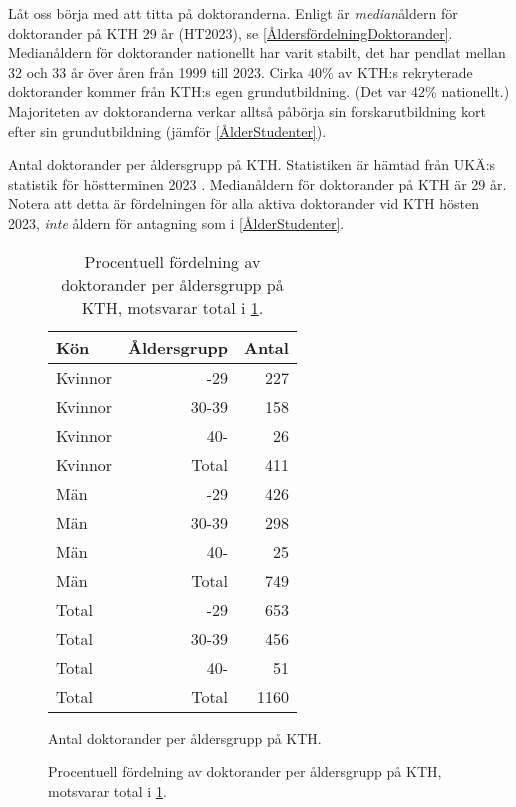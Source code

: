 \documentclass[a4paper,oneside,article,swedish]{memoir}
\begin{document}
Låt oss börja med att titta på doktoranderna.
Enligt \textcite{UKÄstat} är \emph{median}åldern för doktorander på KTH 29 år 
(HT2023), se \cref{ÅldersfördelningDoktorander}.
Medianåldern för doktorander nationellt har varit stabilt, det har pendlat 
mellan 32 och 33 år över åren från 1999 till 2023.
Cirka 40\% av KTH:s rekryterade doktorander kommer från KTH:s egen  
grundutbildning\autocite{UKÄstat}.
(Det var 42\% nationellt.)
Majoriteten av doktoranderna verkar alltså påbörja sin forskarutbildning kort 
efter sin grundutbildning (jämför \cref{ÅlderStudenter}).

\begin{table}
  \begin{sidecaption}{\label{ÅldersfördelningDoktorander}%
    Antal doktorander per åldersgrupp på KTH.
    Statistiken är hämtad från UKÄ:s statistik för höstterminen 2023 
    \parencite{UKÄstat}.
    Medianåldern för doktorander på KTH är 29 år.
    Notera att detta är fördelningen för alla aktiva doktorander vid KTH hösten 
    2023, \emph{inte} åldern för antagning som i \cref{ÅlderStudenter}.
  }%
  \hspace*{\fill}
  \begin{subfigure}[b]{0.45\textwidth}
    \centering
    \begin{tabular}{lrr}
      \toprule
      Kön & Åldersgrupp & Antal \\
      \midrule
      Kvinnor & -29    & 227 \\
      Kvinnor & 30-39  & 158 \\
      Kvinnor & 40-    & 26  \\
      \midrule
      Kvinnor & Total  & 411 \\
      \midrule
      Män     & -29    & 426 \\
      Män     & 30-39  & 298 \\
      Män     & 40-    & 25  \\
      \midrule
      Män     & Total  & 749 \\
      \midrule
      Total   & -29    & 653 \\
      Total   & 30-39  & 456 \\
      Total   & 40-    & 51  \\
      \midrule
      Total   & Total  & 1160 \\
      \bottomrule
    \end{tabular}
    \caption{Antal doktorander per åldersgrupp på KTH.}
    \label{ÅlderDoktorander}
  \end{subfigure}
  \hfill
  \begin{subfigure}[b]{0.45\textwidth}
    \centering
    \caption{Procentuell fördelning av doktorander per åldersgrupp på KTH, motsvarar total i \cref{ÅlderDoktorander}.}
    \label{ProcentuellÅlderDoktorander}
  \end{subfigure}
  \hspace*{\fill}
  \end{sidecaption}
\end{table}
\end{document}
